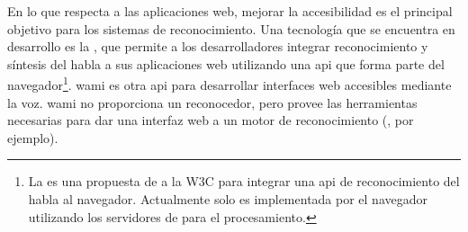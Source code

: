 En lo que respecta a las aplicaciones web, mejorar la accesibilidad es el principal objetivo para 
los sistemas de reconocimiento. Una tecnolog\'ia que se encuentra en desarrollo es la 
 \cite{GoogleWebSpeechAPI}, que permite a los desarrolladores integrar 
reconocimiento y s\'intesis del habla a sus aplicaciones web utilizando una \gls{api} que forma parte 
del navegador\footnote{La  es una propuesta de  a la 
W3C para integrar una \gls{api} de reconocimiento del habla al navegador. Actualmente solo es implementada 
por el navegador  utilizando los servidores de  para el
procesamiento.}. \gls{wami} \cite{GruensteinWami2008, WamiHome} es otra \gls{api} 
para desarrollar interfaces web accesibles mediante la voz. \gls{wami} no proporciona un reconocedor, pero 
provee las herramientas necesarias para dar una interfaz web a un motor de reconocimiento 
(, por ejemplo).